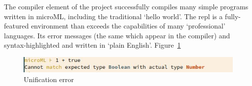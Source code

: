 \documentclass[12pt, a4paper]{report}
\begin{document}
The compiler element of the project successfully compiles many simple programs written in microML,
including the traditional `hello world'. The repl is a fully-featured environment than exceeds the
capabilities of many `professional' languages. Its error messages (the same which appear in the
compiler) and syntax-highlighted and written in `plain English'. Figure~\ref{fig:typeError}

\begin{figure}
    \includegraphics[width=\textwidth]{images/typeError.jpg}
    \caption{Unification error}
\label{fig:typeError}
\end{figure}

\end{document}
